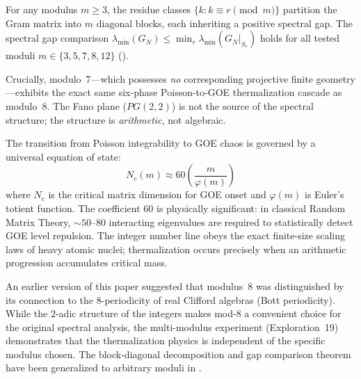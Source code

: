 \begin{principle}
For any modulus $m \geq 3$, the residue classes $\{k : k \equiv r \pmod{m}\}$
partition the Gram matrix into $m$ diagonal blocks, each inheriting a positive
spectral gap. The spectral gap comparison
$\lambda_{\min}(G_N) \leq \min_r \lambda_{\min}(G_N|_{S_r})$
holds for all tested moduli $m \in \{3, 5, 7, 8, 12\}$
().

Crucially, modulo~7---which possesses \emph{no} corresponding projective
finite geometry---exhibits the exact same six-phase Poisson-to-GOE
thermalization cascade as modulo~8. The Fano plane ($PG(2,2)$) is not
the source of the spectral structure; the structure is \emph{arithmetic},
not algebraic.

The transition from Poisson integrability to GOE chaos is governed by a
universal equation of state:
\begin{equation}
  N_c(m) \approx 60 \left(\frac{m}{\varphi(m)}\right)
  \label{eq:universality}
\end{equation}
where $N_c$ is the critical matrix dimension for GOE onset and $\varphi(m)$
is Euler's totient function. The coefficient $60$ is physically significant:
in classical Random Matrix Theory, $\sim 50$--$80$ interacting eigenvalues
are required to statistically detect GOE level repulsion. The integer number
line obeys the exact finite-size scaling laws of heavy atomic nuclei;
thermalization occurs precisely when an arithmetic progression
accumulates critical mass.
\end{principle}

\begin{remark}
An earlier version of this paper suggested that modulus~8 was distinguished
by its connection to the $8$-periodicity of real Clifford algebras
(Bott periodicity). While the $2$-adic structure of the integers makes
mod-8 a convenient choice for the original spectral analysis, the
multi-modulus experiment (Exploration~19) demonstrates that the
thermalization physics is independent of the specific modulus chosen.
The block-diagonal decomposition and gap comparison theorem have been
generalized to arbitrary moduli in .
\end{remark}

